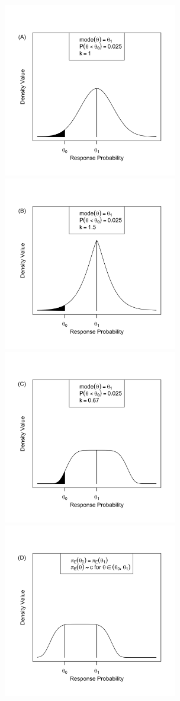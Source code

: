 \documentclass[useAMS,usenatbib,referee]{biom}
\begin{document}
\begin{figure}
\begin{center}
\includegraphics[width=3in]{figure1a.png}
\includegraphics[width=3in]{figure1b.png}
\includegraphics[width=3in]{figure1c.png}
\includegraphics[width=3in]{figure1d.png}

\end{center}
\end{figure}
\end{document}
